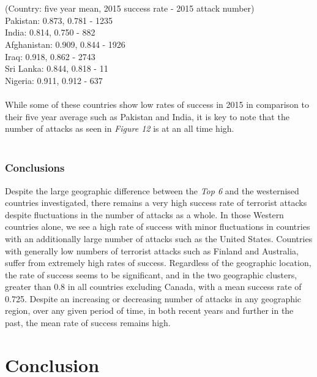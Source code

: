 \documentclass[10pt,a4paper]{article}
\begin{document}
\\\\
\indent \indent(Country: five year mean, 2015 success rate - 2015 attack number) \\
\indent Pakistan: 0.873,  0.781 - 1235  \\
\indent India: 0.814, 0.750 - 882 \\
\indent Afghanistan: 0.909, 0.844 - 1926 \\
\indent Iraq: 0.918, 0.862 - 2743 \\
\indent Sri Lanka: 0.844, 0.818 - 11 \\
\indent Nigeria: 0.911, 0.912 - 637 \\
\\
While some of these countries show low rates of success in 2015 in comparison to their five year average such as Pakistan and India, it is key to note that the number of attacks as seen in \textit{Figure 12} is at an all time high.
\\\\ 
\subsubsection{Conclusions}
Despite the large geographic difference between the \textit{Top 6} and the westernised countries investigated, there remains a very high success rate of terrorist attacks despite fluctuations in the number of attacks as a whole.
In those Western countries alone, we see a high rate of success with minor fluctuations in countries with an additionally large number of attacks such as the United States.
Countries with generally low numbers of terrorist attacks such as Finland and Australia, suffer from extremely high rates of success.
Regardless of the geographic location, the rate of success seems to be significant, and in the two geographic clusters, greater than 0.8 in all countries excluding Canada, with a mean success rate of 0.725.
Despite an increasing or decreasing number of attacks in any geographic region, over any given period of time, in both recent years and further in the past, the mean rate of success remains high.


\section{Conclusion} 
\end{document}

